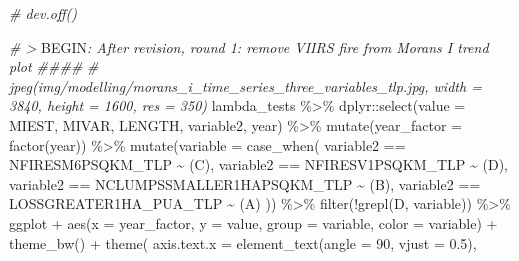 \documentclass[10pt,landscape,a3paper]{article}
\newenvironment{Shaded}{\begin{snugshade}}{\end{snugshade}}
\newcommand{\AttributeTok}[1]{\textcolor[rgb]{0.77,0.63,0.00}{#1}}
\newcommand{\CommentTok}[1]{\textcolor[rgb]{0.56,0.35,0.01}{\textit{#1}}}
\newcommand{\DecValTok}[1]{\textcolor[rgb]{0.00,0.00,0.81}{#1}}
\newcommand{\FloatTok}[1]{\textcolor[rgb]{0.00,0.00,0.81}{#1}}
\newcommand{\FunctionTok}[1]{\textcolor[rgb]{0.00,0.00,0.00}{#1}}
\newcommand{\NormalTok}[1]{#1}
\newcommand{\RegionMarkerTok}[1]{#1}
\newcommand{\SpecialCharTok}[1]{\textcolor[rgb]{0.00,0.00,0.00}{#1}}
\newcommand{\StringTok}[1]{\textcolor[rgb]{0.31,0.60,0.02}{#1}}
\begin{document}
\begin{Shaded}
\begin{Highlighting}[]
\CommentTok{\# dev.off()}

\CommentTok{\# \textgreater{} }\RegionMarkerTok{BEGIN}\CommentTok{: After revision, round 1: remove VIIRS fire from Moran\textquotesingle{}s I trend plot \#\#\#\#}
\CommentTok{\# jpeg(\textquotesingle{}img/modelling/morans\_i\_time\_series\_three\_variables\_tlp.jpg\textquotesingle{}, width = 3840, height = 1600, res = 350)}
\NormalTok{lambda\_tests }\SpecialCharTok{\%\textgreater{}\%} 
\NormalTok{  dplyr}\SpecialCharTok{::}\FunctionTok{select}\NormalTok{(}\AttributeTok{value =}\NormalTok{ MIEST, MIVAR, LENGTH, variable2, year) }\SpecialCharTok{\%\textgreater{}\%} 
  \FunctionTok{mutate}\NormalTok{(}\AttributeTok{year\_factor =} \FunctionTok{factor}\NormalTok{(year)) }\SpecialCharTok{\%\textgreater{}\%} 
    \FunctionTok{mutate}\NormalTok{(}\AttributeTok{variable =} \FunctionTok{case\_when}\NormalTok{(}
\NormalTok{    variable2 }\SpecialCharTok{==} \StringTok{\textquotesingle{}NFIRESM6PSQKM\_TLP\textquotesingle{}} \SpecialCharTok{\textasciitilde{}} \StringTok{\textquotesingle{}(C)\textquotesingle{}}\NormalTok{,}
\NormalTok{    variable2 }\SpecialCharTok{==} \StringTok{\textquotesingle{}NFIRESV1PSQKM\_TLP\textquotesingle{}} \SpecialCharTok{\textasciitilde{}} \StringTok{\textquotesingle{}(D)\textquotesingle{}}\NormalTok{,}
\NormalTok{    variable2 }\SpecialCharTok{==} \StringTok{\textquotesingle{}NCLUMPSSMALLER1HAPSQKM\_TLP\textquotesingle{}} \SpecialCharTok{\textasciitilde{}} \StringTok{\textquotesingle{}(B)\textquotesingle{}}\NormalTok{,}
\NormalTok{    variable2 }\SpecialCharTok{==} \StringTok{\textquotesingle{}LOSSGREATER1HA\_PUA\_TLP\textquotesingle{}} \SpecialCharTok{\textasciitilde{}} \StringTok{\textquotesingle{}(A)\textquotesingle{}}
\NormalTok{    )) }\SpecialCharTok{\%\textgreater{}\%} 
  \FunctionTok{filter}\NormalTok{(}\SpecialCharTok{!}\FunctionTok{grepl}\NormalTok{(}\StringTok{\textquotesingle{}D\textquotesingle{}}\NormalTok{, variable)) }\SpecialCharTok{\%\textgreater{}\%} 
\NormalTok{  ggplot }\SpecialCharTok{+}
  \FunctionTok{aes}\NormalTok{(}\AttributeTok{x =}\NormalTok{ year\_factor, }\AttributeTok{y =}\NormalTok{ value, }\AttributeTok{group =}\NormalTok{ variable, }\AttributeTok{color =}\NormalTok{ variable) }\SpecialCharTok{+}
  \FunctionTok{theme\_bw}\NormalTok{() }\SpecialCharTok{+}
  \FunctionTok{theme}\NormalTok{(}
    \AttributeTok{axis.text.x =} \FunctionTok{element\_text}\NormalTok{(}\AttributeTok{angle =} \DecValTok{90}\NormalTok{, }\AttributeTok{vjust =} \FloatTok{0.5}\NormalTok{),}

\end{Highlighting}
\end{Shaded}
\end{document}
